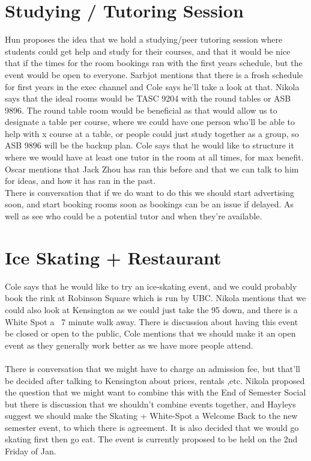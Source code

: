 \documentclass[12pt]{article}
\begin{document}
\section{Studying / Tutoring Session} \label{sec:Tutor}
\noindent Hun proposes the idea that we hold a studying/peer tutoring session where students could get help and study for their courses, and that it would be nice that if the times for the room bookings ran with the first years schedule, but the event would be open to everyone. Sarbjot mentions that there is a frosh schedule for first years in the exec channel and Cole says he'll take a look at that. Nikola says that the ideal rooms would be TASC 9204 with the round tables or ASB 9896. The round table room would be beneficial as that would allow us to designate a table per course, where we could have one person who'll be able to help with x course at a table, or people could just study together as a group, so ASB 9896 will be the backup plan.  Cole says that he would like to structure it where we would have at least one tutor in the room at all times, for max benefit. Oscar mentions that Jack Zhou has ran this before and that we can talk to him for ideas, and how it has ran in the past.  \\ 

\noindent There is conversation that if we do want to do this we should start advertising soon, and start booking rooms soon as bookings can be an issue if delayed. As well as see who could be a potential tutor and when they're available. 

\section{Ice Skating + Restaurant} \label{sec:Skate}
\noindent Cole says that he would like to try an ice-skating event, and we could probably book the rink at Robinson Square which is run by UBC. Nikola mentions that we could also look at Kensington as we could just take the 95 down, and there is a White Spot a ~7 minute walk away.  There is discussion about having this event be closed or open to the public, Cole mentions that we should make it an open event as they generally work better as we have more people attend. \\  \\
\noindent There is conversation that we might have to charge an admission fee, but that'll be decided after talking to Kensington about prices, rentals ,etc. Nikola proposed the question that we might want to combine this with the End of Semester Social but there is discussion that we shouldn't combine events together, and Hayleys suggest we should make the Skating + White-Spot a  Welcome Back to the new semester event, to which there is agreement. It is also decided that we would go skating first then go eat. The event is currently proposed to be held on the 2nd Friday of Jan.
\end{document}
